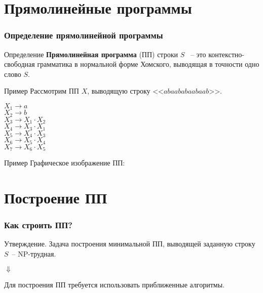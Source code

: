 ﻿\documentclass[10pt,pdf,hyperref={unicode}]{beamer}
\begin{document}
\section{Прямолинейные программы}

\begin{frame}
\frametitle{Определение прямолинейной программы}

\begin{block}{Определение}
\textbf{Прямолинейная программа} (ПП) строки $S$ ~-- это
контекстно-свободная грамматика в нормальной форме Хомского, выводящая в точности одно слово $S$.
\end{block}

\pause

\begin{exampleblock}{Пример}
Рассмотрим ПП $X$, выводящую строку $\mbox{<<}abaababaabaab\mbox{>>}$.

\begin{center}
$X_1 \to a$\\
$X_2 \to b$\\
$X_3 \to X_1 \cdot X_2$\\
$X_4 \to X_3 \cdot X_1$\\
$X_5 \to X_4 \cdot X_3$\\
$X_6 \to X_5 \cdot X_4$\\
$X_7 \to X_6 \cdot X_5$
\end{center}
\end{exampleblock}

\end{frame}

\begin{frame}
\begin{exampleblock}{Пример}
Графическое изображение ПП:

\picFibonacciSLP
\end{exampleblock}
\end{frame}

\section{Построение ПП}

\begin{frame}
\frametitle{Как строить ПП?}
\begin{block}{Утверждение.}
Задача построения минимальной ПП, выводящей заданную строку $S$~-- NP-трудная.
\end{block}

\pause

\begin{center}
$\Downarrow$
\end{center}

\begin{block}{}
Для построения ПП требуется использовать приближенные алгоритмы.
\end{block}
\end{frame}
\end{document}
